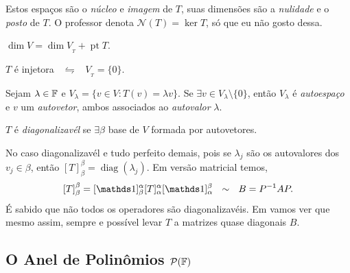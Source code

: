\begin{note}
    Estos espaços são o \emph{núcleo} e \emph{imagem} de \(T\), suas dimensões são a \emph{nulidade} e o \emph{posto} de \(T\). O professor denota \(\mathcal{N}(T) = \ker T\), só que eu não gosto dessa.
\end{note}

\begin{theorem}
    \(\dim V = \dim V_{_T} + \operatorname{pt} T\). 
\end{theorem}

\begin{proposition}
    \(T \) é injetora \ \(\leftrightharpoons\)  \ \(V_{_T} = \{0\}\). 
\end{proposition}

\begin{definition}
    Sejam \(\lambda \in \mathbb{F}\) e \(V_\lambda = \{v\in V: T(v) = \lambda v \}\). Se \(\exists v\in V_\lambda \setminus\{0\}\), então \(V_\lambda\) é \emph{autoespaço} e \(v\) um \emph{autovetor}, ambos associados ao \emph{autovalor} \(\lambda\). 
\end{definition}


\begin{definition}
    \(T\) é \emph{diagonalizavél} se \(\exists \beta \) base de \(V\) formada por autovetores.
\end{definition}

\begin{note}
    No caso diagonalizavél e tudo perfeito demais, pois se \(\lambda_j\) são os autovalores dos \(v_j \in \beta \), então \([T]^\beta_\beta = \operatorname{diag}(\lambda_j)\). Em versão matricial temos,
    \[[T]^\beta_\beta = [\id]^\alpha_\beta [T]^\alpha_\alpha [\id]^\beta_\alpha \ \ \sim \ \ B = P^{-1} A P.\]
    É sabido que não todos os operadores são diagonalizavéis. Em \cite[Cap. 8]{MA719} vamos ver que mesmo assim, sempre e possível levar \(T\) a matrizes quase diagonais $B$. %
\end{note}

\subsection*{O Anel de Polinômios \(\mathcal{P}(\mathbb{F})\)}

